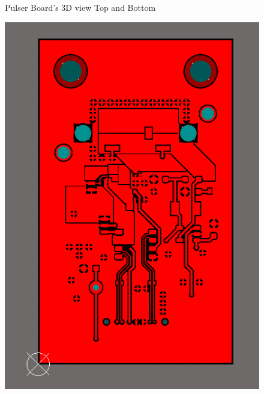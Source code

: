 \documentclass[a4paper,11pt]{article}
\begin{document}
\begin{figure}[htbp]
\caption{Pulser Board's 3D view Top and Bottom\label{fig:PulserBoard0.93DTopandBottom}}
\end{figure}

\begin{figure}[htbp]
\centering
\includegraphics[scale=0.5]{PulserBoard0.9TopLayer.png}
\qquad

\end{figure}
\end{document}
